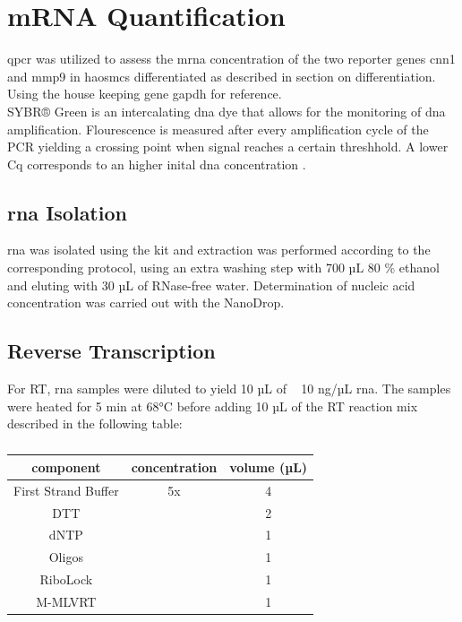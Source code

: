 \section{mRNA Quantification}
\label{sec:qpcr}
\ac{qpcr} was utilized to assess the m\ac{rna} concentration of the two reporter genes \ac{cnn1} and \ac{mmp9} in \acp{haosmc} differentiated as described in section on differentiation. Using the house keeping gene \ac{gapdh} for reference.\\
SYBR® Green is an intercalating \ac{dna} dye that allows for the monitoring of \ac{dna} amplification. Flourescence is measured after every amplification cycle of the PCR yielding a crossing point when signal reaches a certain threshhold. A lower \ac{Cq} corresponds to an higher inital \ac{dna} concentration \cite{huggettStandardisationReportingNucleic2011}.

    \subsection{\ac{rna} Isolation}
    \ac{rna} was isolated using the kit and extraction was performed according to the corresponding protocol, using an extra washing step with 700 µL 80 \% ethanol and eluting with 30 µL of RNase-free water. Determination of nucleic acid concentration was carried out with the NanoDrop.

    \subsection{Reverse Transcription}
    For \ac{RT}, \ac{rna} samples were diluted to yield 10 µL of ~ 10 ng/µL \ac{rna}. The samples were heated for 5 min at 68°C before adding 10 µL of the RT reaction mix described in the following table:

    \begin{table}[h]
    \capstart
	\centering
	\begin{minipage}{\captionwidth}
	   	\caption[RT mastermix]{}
	   	\label{tab:RT Mastr Mix}
	\end{minipage}
    \begin{tabular}{|c|c|c|}
        \hline
        component           & concentration & volume (µL) \\ \hline
        First Strand Buffer & 5x            & 4           \\
        \acs{DTT}            &               & 2           \\
        \acs{dNTP}           &               & 1           \\
        Oligos              &               & 1           \\
        RiboLock            &               & 1           \\
        M-MLVRT             &               & 1           \\ \hline
    \end{tabular}
    \end{table}

